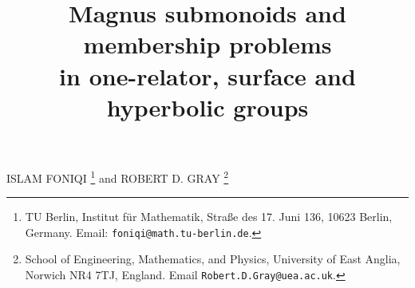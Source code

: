 \documentclass[11pt]{amsart}
\title[Magnus submonoids and membership problems]{Magnus submonoids and membership problems \\ in one-relator, surface and hyperbolic groups}
\theoremstyle{plain}
\theoremstyle{definition}
\begin{document}
\vspace{-8mm}

\maketitle

\vspace{-4mm}

\begin{center}
ISLAM FONIQI
\footnote{
TU Berlin, Institut für Mathematik, Straße des 17. Juni 136, 10623 Berlin, Germany. 
Email: \texttt{foniqi@math.tu-berlin.de}.
}
and
ROBERT D. GRAY
\footnote{School of Engineering, Mathematics, and Physics, University of East Anglia, Norwich NR4 7TJ, England.
Email \texttt{Robert.D.Gray@uea.ac.uk}.
}

\end{center}
\end{document}
